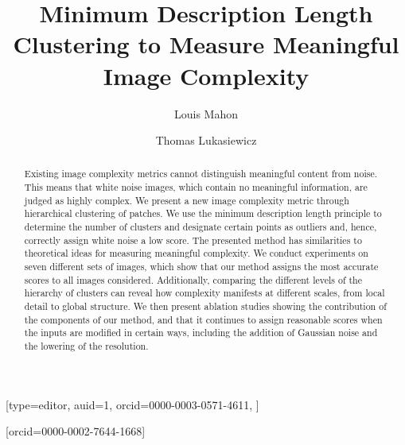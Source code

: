 \documentclass[a4paper,fleqn]{cas-sc}
\title{Minimum Description Length Clustering to Measure Meaningful Image Complexity}
\theoremstyle{remark}
\begin{document}


%
\author[1,2]{Louis Mahon}[type=editor,
       auid=1,
       orcid=0000-0003-0571-4611,
       ]





\author[1,3]{Thomas Lukasiewicz}[orcid=0000-0002-7644-1668]


\maketitle


\doublespacing


\begin{abstract}
       Existing image complexity metrics cannot distinguish meaningful content from noise. This means that white noise images, which contain no meaningful information, are judged as highly complex. We present a new image complexity metric through hierarchical clustering of patches. We use the minimum description length principle to determine the number of clusters and designate certain points as outliers and, hence, correctly assign white noise a low score. The presented method has similarities to theoretical ideas for measuring meaningful complexity. We conduct experiments on seven different sets of images, which show that our method assigns the most accurate scores to all images considered. Additionally, comparing the different levels of the hierarchy of clusters can reveal how complexity manifests at different scales, from local detail to global structure. We then present ablation studies showing the contribution of the components of our method, and that it continues to assign reasonable scores when the inputs are modified in certain ways, including the addition of Gaussian noise and the lowering of the resolution.

\end{abstract}
\end{document}
